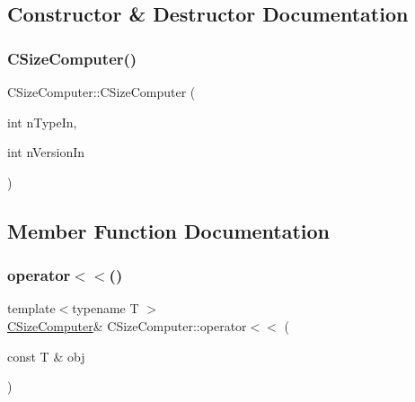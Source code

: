 \subsection{Constructor \& Destructor Documentation}
\mbox{\label{class_c_size_computer_a475a1a15be285c38c4b94ad0ab0ce73c}} 
\subsubsection{\texorpdfstring{C\+Size\+Computer()}{CSizeComputer()}}
{\footnotesize\ttfamily C\+Size\+Computer\+::\+C\+Size\+Computer (\begin{DoxyParamCaption}\item[{int}]{n\+Type\+In,  }\item[{int}]{n\+Version\+In }\end{DoxyParamCaption})\hspace{0.3cm}{\ttfamily [inline]}}



\subsection{Member Function Documentation}
\mbox{\label{class_c_size_computer_a03a29c76f82dca1559e7922b35bebd0d}} 
\subsubsection{\texorpdfstring{operator$<$$<$()}{operator<<()}}
{\footnotesize\ttfamily template$<$typename T $>$ \\
\mbox{\hyperlink{class_c_size_computer}{C\+Size\+Computer}}\& C\+Size\+Computer\+::operator$<$$<$ (\begin{DoxyParamCaption}\item[{const T \&}]{obj }\end{DoxyParamCaption})\hspace{0.3cm}{\ttfamily [inline]}}

\mbox{\label{class_c_size_computer_a649d670bdcfee2b47a1982af566d3d7d}} 
